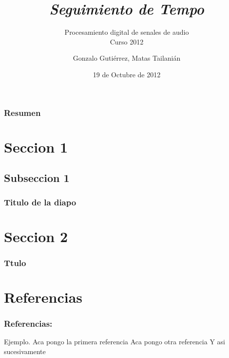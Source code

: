 \documentclass[slidestop,compress,mathserif,xcolor=svgnames,table]{beamer}
\author{Gonzalo Gutiérrez, Matas Tailanián}
\date{19 de Octubre de 2012}
\title{\textit{Seguimiento de Tempo}}
\subtitle{Procesamiento digital de senales de audio\\Curso 2012}
\begin{document}
\begin{frame}
  \titlepage
\end{frame}

\begin{frame}
\frametitle{Resumen}
\tableofcontents
\end{frame}


\section{Seccion 1}
\subsection{Subseccion 1}
\begin{frame}
\frametitle{Titulo de la diapo}
	
\end{frame}


\section{Seccion 2}
\begin{frame}
\frametitle{Ttulo}

\end{frame}


\section{Referencias}
\begin{frame}
\frametitle{Referencias:}
\begin{thebibliography}{99}
\begin{small}
 Ejemplo. Aca pongo la primera referencia
\vspace{-5pt}
  Aca pongo otra referencia
\vspace{-5pt}
 Y asi sucesivamente
\end{small}
\end{thebibliography}
\end{frame}


\end{document}

